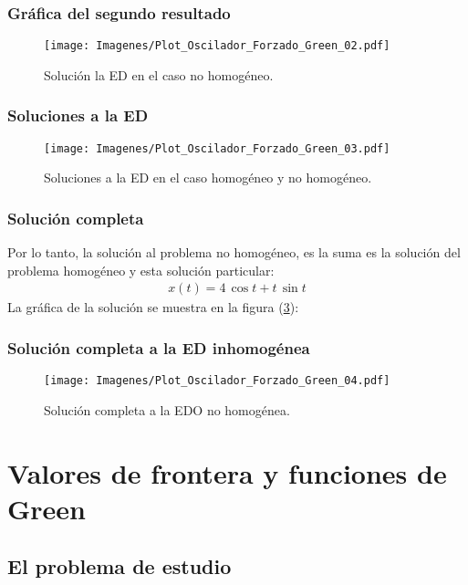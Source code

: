 \documentclass[12pt]{beamer}
\begin{document}
\begin{frame}
\frametitle{Gráfica del segundo resultado}
\begin{figure}[H]
    \centering
    \texttt{[image: Imagenes/Plot\_Oscilador\_Forzado\_Green\_02.pdf]}
    \caption{Solución la ED en el caso no homogéneo.}
    \label{fig:figura_02}
\end{figure}
\end{frame}
\begin{frame}
\frametitle{Soluciones a la ED}
\begin{figure}[H]
    \centering
    \texttt{[image: Imagenes/Plot\_Oscilador\_Forzado\_Green\_03.pdf]}
    \caption{Soluciones a la ED en el caso homogéneo y no homogéneo.}
    \label{fig:figura_03}
\end{figure}
\end{frame}
\begin{frame}
\frametitle{Solución completa}
Por lo tanto, la solución al problema no homogéneo, es la suma es la solución del problema homogéneo y esta solución particular:
\pause
\begin{align*}
x (t) = 4 \, \cos t + t \, \sin t
\end{align*}
La gráfica de la solución se muestra en la figura (\ref{fig:figura_04}):
\end{frame}
\begin{frame}
\frametitle{Solución completa a la ED inhomogénea}
\begin{figure}[H]
    \centering
    \texttt{[image: Imagenes/Plot\_Oscilador\_Forzado\_Green\_04.pdf]}
    \caption{Solución completa a la EDO no homogénea.}
    \label{fig:figura_04}
\end{figure}
\end{frame}

\section{Valores de frontera y funciones de Green}
\subsection{El problema de estudio}
\end{document}
